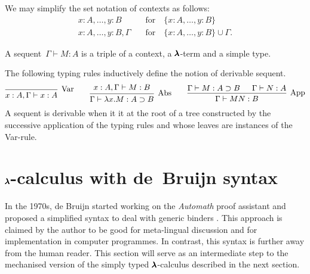 \begin{notation} We may simplify the set notation of contexts as follows:
  \begin{align*}
    x:A, \dots, y:B         \quad &\text{for} \quad \{ x:A, \dots, y:B \} \\
    x:A, \dots, y:B, \Gamma \quad &\text{for} \quad \{ x:A, \dots, y:B \} \cup \Gamma.
  \end{align*}
\end{notation}

\begin{definition}[Sequent]
  A sequent~$\Gamma \vdash M:A$ is a triple of a context, a $\pmb{\lambda}$-term and a simple type.
\end{definition}

\begin{definition}
  \label{typing_rules}
  The following typing rules inductively define the notion of derivable sequent.
  \[
    \begin{prooftree}
      \infer0[Var]{ x:A, \Gamma \vdash x:A } 
    \end{prooftree}
    \qquad
    \begin{prooftree}
      \hypo{ x:A, \Gamma \vdash M:B }
      \infer1[Abs]{ \Gamma \vdash \lambda x . M : A \supset B  } 
    \end{prooftree}
    \qquad
    \begin{prooftree}
      \hypo{ \Gamma \vdash M : A \supset B }
      \hypo{ \Gamma \vdash N : A }	
      \infer2[App]{ \Gamma \vdash M N : B } 
    \end{prooftree}
  \]
  A sequent is derivable when it it at the root of a tree constructed by the successive application of the typing rules and whose leaves are instances of the Var-rule.  
\end{definition}


\section{$\pmb{\lambda}$-calculus with de~Bruijn syntax}

In the 1970s, de Bruijn started working on the \textit{Automath} proof assistant and proposed a simplified syntax to deal with generic binders \cite{deBruijn}.
This approach is claimed by the author to be good for meta-lingual discussion and for implementation in computer programmes.
In contrast, this syntax is further away from the human reader.
This section will serve as an intermediate step to the mechanised version of the simply typed $\pmb{\lambda}$-calculus described in the next section.

